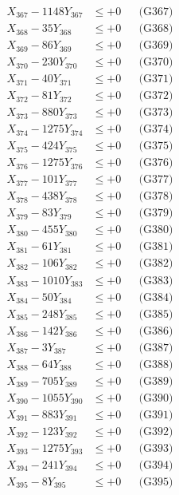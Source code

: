 \documentclass[a4paper,10pt]{article}
\begin{document}
{\begin{align}
X_{367} - 1148Y_{367} &\leq +0 && \text{(G367)} \\
X_{368} - 35Y_{368} &\leq +0 && \text{(G368)} \\
X_{369} - 86Y_{369} &\leq +0 && \text{(G369)} \\
X_{370} - 230Y_{370} &\leq +0 && \text{(G370)} \\
\allowbreak
X_{371} - 40Y_{371} &\leq +0 && \text{(G371)} \\
X_{372} - 81Y_{372} &\leq +0 && \text{(G372)} \\
X_{373} - 880Y_{373} &\leq +0 && \text{(G373)} \\
X_{374} - 1275Y_{374} &\leq +0 && \text{(G374)} \\
X_{375} - 424Y_{375} &\leq +0 && \text{(G375)} \\
X_{376} - 1275Y_{376} &\leq +0 && \text{(G376)} \\
X_{377} - 101Y_{377} &\leq +0 && \text{(G377)} \\
X_{378} - 438Y_{378} &\leq +0 && \text{(G378)} \\
X_{379} - 83Y_{379} &\leq +0 && \text{(G379)} \\
X_{380} - 455Y_{380} &\leq +0 && \text{(G380)} \\
\allowbreak
X_{381} - 61Y_{381} &\leq +0 && \text{(G381)} \\
X_{382} - 106Y_{382} &\leq +0 && \text{(G382)} \\
X_{383} - 1010Y_{383} &\leq +0 && \text{(G383)} \\
X_{384} - 50Y_{384} &\leq +0 && \text{(G384)} \\
X_{385} - 248Y_{385} &\leq +0 && \text{(G385)} \\
X_{386} - 142Y_{386} &\leq +0 && \text{(G386)} \\
X_{387} - 3Y_{387} &\leq +0 && \text{(G387)} \\
X_{388} - 64Y_{388} &\leq +0 && \text{(G388)} \\
X_{389} - 705Y_{389} &\leq +0 && \text{(G389)} \\
X_{390} - 1055Y_{390} &\leq +0 && \text{(G390)} \\
\allowbreak
X_{391} - 883Y_{391} &\leq +0 && \text{(G391)} \\
X_{392} - 123Y_{392} &\leq +0 && \text{(G392)} \\
X_{393} - 1275Y_{393} &\leq +0 && \text{(G393)} \\
X_{394} - 241Y_{394} &\leq +0 && \text{(G394)} \\
X_{395} - 8Y_{395} &\leq +0 && \text{(G395)} \\

\end{align}}
\end{document}
